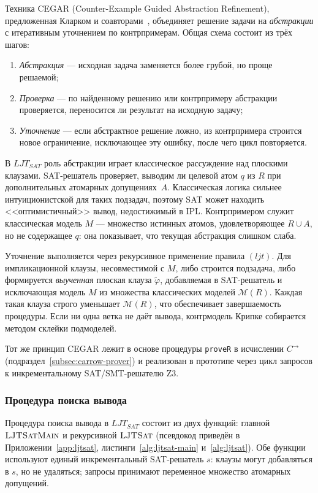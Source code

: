 \documentclass[14pt, russian]{scrartcl}
\begin{document}
Техника CEGAR (Counter-Example Guided Abstraction Refinement), предложенная
Кларком и соавторами~\cite{Clarke2000CEGAR}, объединяет решение задачи на
\emph{абстракции} с итеративным уточнением по контрпримерам. Общая схема
состоит из трёх шагов:
\begin{enumerate}
\item \emph{Абстракция} --- исходная задача заменяется более грубой, но проще
  решаемой;
\item \emph{Проверка} --- по найденному решению или контрпримеру абстракции
  проверяется, переносится ли результат на исходную задачу;
\item \emph{Уточнение} --- если абстрактное решение ложно, из контрпримера
  строится новое ограничение, исключающее эту ошибку, после чего цикл
  повторяется.
\end{enumerate}

В $LJT_{SAT}$ роль абстракции играет классическое рассуждение над плоскими
клаузами. SAT-решатель проверяет, выводим ли целевой атом $q$ из $R$ при
дополнительных атомарных допущениях~$A$. Классическая логика сильнее
интуиционистской для таких подзадач, поэтому SAT может находить <<оптимистичный>>
вывод, недостижимый в IPL. Контрпримером служит классическая модель $M$ ---
множество истинных атомов, удовлетворяющее $R \cup A$, но не содержащее $q$:
она показывает, что текущая абстракция слишком слаба.

Уточнение выполняется через рекурсивное применение правила $(ljt)$. Для
импликационной клаузы, несовместимой с $M$, либо строится подзадача, либо
формируется \emph{выученная} плоская клауза $\tilde{\varphi}$, добавляемая в
SAT-решатель и исключающая модель $M$ из множества классических моделей
$\mathcal{M}(R)$. Каждая такая клауза строго уменьшает $\mathcal{M}(R)$, что
обеспечивает завершаемость процедуры. Если ни одна ветка не даёт вывода,
контрмодель Крипке собирается методом склейки подмоделей.

Тот же принцип CEGAR лежит в основе процедуры \texttt{proveR} в исчислении
$C^{\rightarrow}$ (подраздел~\ref{subsec:carrow-prover}) и реализован в прототипе
через цикл запросов к инкрементальному SAT/SMT-решателю Z3.

\subsubsection{Процедура поиска вывода}

Процедура поиска вывода в $LJT_{SAT}$ состоит из двух функций: главной
$\textsc{LJTSatMain}$ и рекурсивной $\textsc{LJTSat}$ (псевдокод приведён в
Приложении~\ref{app:ljtsat}, листинги~\ref{alg:ljtsat-main}
и~\ref{alg:ljtsat}). Обе функции используют единый инкрементальный SAT-решатель
$s$: клаузы могут добавляться в $s$, но не удаляться; запросы принимают
переменное множество атомарных допущений.
\end{document}
